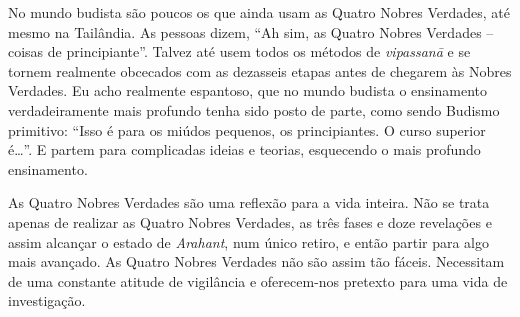 No mundo budista são poucos os que ainda usam as Quatro Nobres Verdades, até
mesmo na Tailândia. As pessoas dizem, “Ah sim, as Quatro Nobres Verdades –
coisas de principiante”. Talvez até usem todos os métodos de \emph{vipassanā} e
se tornem realmente obcecados com as dezasseis etapas antes de chegarem às
Nobres Verdades. Eu acho realmente espantoso, que no mundo budista o ensinamento
verdadeiramente mais profundo tenha sido posto de parte, como sendo Budismo
primitivo: “Isso é para os miúdos pequenos, os principiantes. O curso superior
é\ldots{}”. E partem para complicadas ideias e teorias, esquecendo o mais
profundo ensinamento.

As Quatro Nobres Verdades são uma reflexão para a vida inteira. Não se trata
apenas de realizar as Quatro Nobres Verdades, as três fases e doze revelações e
assim alcançar o estado de \emph{Arahant}, num único retiro, e então partir para
algo mais avançado. As Quatro Nobres Verdades não são assim tão fáceis.
Necessitam de uma constante atitude de vigilância e oferecem-nos pretexto para
uma vida de investigação.

